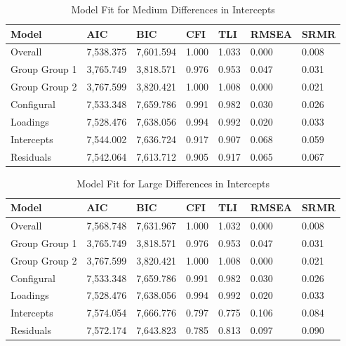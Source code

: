 \documentclass[
  man,floatsintext]{apa7}
\begin{document}
\begin{table}[tbp]

\begin{center}
\begin{threeparttable}

\caption{\label{tab:tab6}Model Fit for Medium Differences in Intercepts}

\begin{tabular}{lllllll}
\toprule
Model & AIC & BIC & CFI & TLI & RMSEA & SRMR\\
\midrule
Overall & 7,538.375 & 7,601.594 & 1.000 & 1.033 & 0.000 & 0.008\\
Group Group 1 & 3,765.749 & 3,818.571 & 0.976 & 0.953 & 0.047 & 0.031\\
Group Group 2 & 3,767.599 & 3,820.421 & 1.000 & 1.008 & 0.000 & 0.021\\
Configural & 7,533.348 & 7,659.786 & 0.991 & 0.982 & 0.030 & 0.026\\
Loadings & 7,528.476 & 7,638.056 & 0.994 & 0.992 & 0.020 & 0.033\\
Intercepts & 7,544.002 & 7,636.724 & 0.917 & 0.907 & 0.068 & 0.059\\
Residuals & 7,542.064 & 7,613.712 & 0.905 & 0.917 & 0.065 & 0.067\\
\bottomrule
\end{tabular}

\end{threeparttable}
\end{center}

\end{table}

\begin{table}[tbp]

\begin{center}
\begin{threeparttable}

\caption{\label{tab:tab7}Model Fit for Large Differences in Intercepts}

\begin{tabular}{lllllll}
\toprule
Model & AIC & BIC & CFI & TLI & RMSEA & SRMR\\
\midrule
Overall & 7,568.748 & 7,631.967 & 1.000 & 1.032 & 0.000 & 0.008\\
Group Group 1 & 3,765.749 & 3,818.571 & 0.976 & 0.953 & 0.047 & 0.031\\
Group Group 2 & 3,767.599 & 3,820.421 & 1.000 & 1.008 & 0.000 & 0.021\\
Configural & 7,533.348 & 7,659.786 & 0.991 & 0.982 & 0.030 & 0.026\\
Loadings & 7,528.476 & 7,638.056 & 0.994 & 0.992 & 0.020 & 0.033\\
Intercepts & 7,574.054 & 7,666.776 & 0.797 & 0.775 & 0.106 & 0.084\\
Residuals & 7,572.174 & 7,643.823 & 0.785 & 0.813 & 0.097 & 0.090\\
\bottomrule
\end{tabular}

\end{threeparttable}
\end{center}

\end{table}
\end{document}
